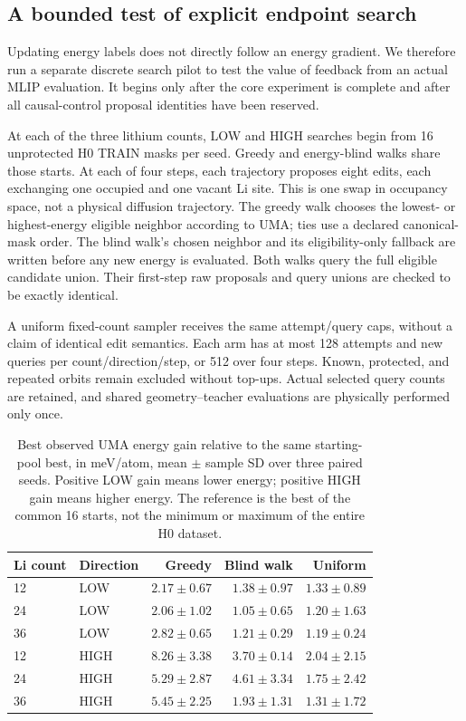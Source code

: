 \subsection{A bounded test of explicit endpoint search}
Updating energy labels does not directly follow an energy gradient. We
therefore run a separate discrete search pilot to test the value of feedback
from an actual MLIP evaluation. It begins only after the core experiment is
complete and after all causal-control proposal identities have been reserved.

At each of the three lithium counts, LOW and HIGH searches begin from 16
unprotected H0 TRAIN masks per seed. Greedy and energy-blind walks share those
starts. At each of four steps, each trajectory proposes eight edits, each
exchanging one occupied and one vacant Li site. This is one swap in occupancy
space, not a physical diffusion trajectory. The greedy walk chooses the
lowest- or highest-energy eligible neighbor according to UMA; ties use a
declared canonical-mask order. The blind walk's chosen neighbor and its
eligibility-only fallback are written before any new energy is evaluated.
Both walks query the full eligible candidate union. Their first-step raw
proposals and query unions are checked to be exactly identical.

A uniform fixed-count sampler receives the same attempt/query caps, without
a claim of identical edit semantics. Each arm has at most 128 attempts and
new queries per count/direction/step, or 512 over four steps. Known,
protected, and repeated orbits remain excluded without top-ups. Actual
selected query counts are retained, and shared geometry--teacher evaluations
are physically performed only once.

\begin{table}[htbp]
\centering\small
\caption{Best observed UMA energy gain relative to the same starting-pool
best, in meV/atom, mean $\pm$ sample SD over three paired seeds. Positive
LOW gain means lower energy; positive HIGH gain means higher energy.
The reference is the best of the common 16 starts, not the minimum or
maximum of the entire H0 dataset.}
\begin{tabular}{llrrr}\toprule
Li count & Direction & Greedy & Blind walk & Uniform\\\midrule
12 & LOW  & $2.17\pm0.67$ & $1.38\pm0.97$ & $1.33\pm0.89$\\
24 & LOW  & $2.06\pm1.02$ & $1.05\pm0.65$ & $1.20\pm1.63$\\
36 & LOW  & $2.82\pm0.65$ & $1.21\pm0.29$ & $1.19\pm0.24$\\
12 & HIGH & $8.26\pm3.38$ & $3.70\pm0.14$ & $2.04\pm2.15$\\
24 & HIGH & $5.29\pm2.87$ & $4.61\pm3.34$ & $1.75\pm2.42$\\
36 & HIGH & $5.45\pm2.25$ & $1.93\pm1.31$ & $1.31\pm1.72$\\
\bottomrule\end{tabular}
\end{table}

